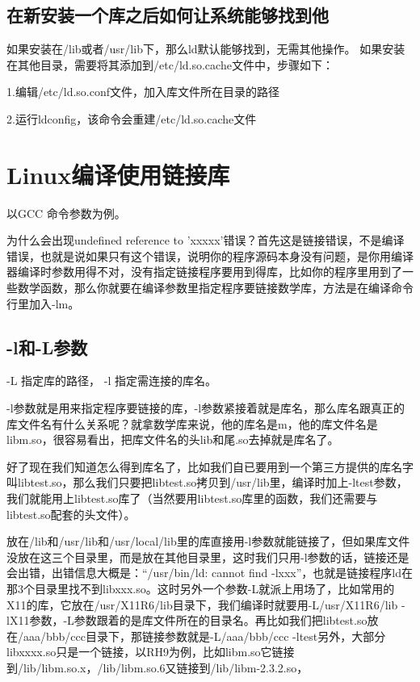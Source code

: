 \subsection{在新安装一个库之后如何让系统能够找到他} 
如果安装在/lib或者/usr/lib下，那么ld默认能够找到，无需其他操作。   如果安装在其他目录，需要将其添加到/etc/ld.so.cache文件中，步骤如下：
 
1.编辑/etc/ld.so.conf文件，加入库文件所在目录的路径  

2.运行ldconfig，该命令会重建/etc/ld.so.cache文件



\section{Linux编译使用链接库}
以GCC 命令参数为例。

为什么会出现undefined reference to 'xxxxx'错误？首先这是链接错误，不是编译错误，也就是说如果只有这个错误，说明你的程序源码本身没有问题，是你用编译器编译时参数用得不对，没有指定链接程序要用到得库，比如你的程序里用到了一些数学函数，那么你就要在编译参数里指定程序要链接数学库，方法是在编译命令行里加入-lm。


\subsection{-l和-L参数}
 -L 指定库的路径， -l 指定需连接的库名。

-l参数就是用来指定程序要链接的库，-l参数紧接着就是库名，那么库名跟真正的库文件名有什么关系呢？就拿数学库来说，他的库名是m，他的库文件名是libm.so，很容易看出，把库文件名的头lib和尾.so去掉就是库名了。

好了现在我们知道怎么得到库名了，比如我们自已要用到一个第三方提供的库名字叫libtest.so，那么我们只要把libtest.so拷贝到/usr/lib里，编译时加上-ltest参数，我们就能用上libtest.so库了（当然要用libtest.so库里的函数，我们还需要与libtest.so配套的头文件）。

放在/lib和/usr/lib和/usr/local/lib里的库直接用-l参数就能链接了，但如果库文件没放在这三个目录里，而是放在其他目录里，这时我们只用-l参数的话，链接还是会出错，出错信息大概是：“/usr/bin/ld: cannot find -lxxx”，也就是链接程序ld在那3个目录里找不到libxxx.so。这时另外一个参数-L就派上用场了，比如常用的X11的库，它放在/usr/X11R6/lib目录下，我们编译时就要用-L/usr/X11R6/lib -lX11参数，-L参数跟着的是库文件所在的目录名。再比如我们把libtest.so放在/aaa/bbb/ccc目录下，那链接参数就是-L/aaa/bbb/ccc -ltest另外，大部分libxxxx.so只是一个链接，以RH9为例，比如libm.so它链接到/lib/libm.so.x，/lib/libm.so.6又链接到/lib/libm-2.3.2.so，

